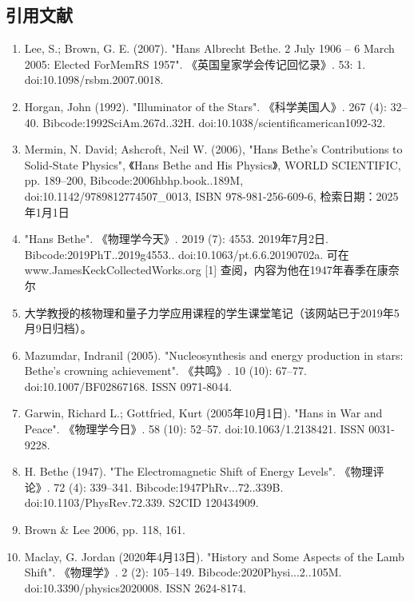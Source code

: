 \subsection{引用文献}  
\begin{enumerate}
\item Lee, S.; Brown, G. E. (2007). "Hans Albrecht Bethe. 2 July 1906 -- 6 March 2005: Elected ForMemRS 1957". 《英国皇家学会传记回忆录》. 53: 1. doi:10.1098/rsbm.2007.0018.  
\item Horgan, John (1992). "Illuminator of the Stars". 《科学美国人》. 267 (4): 32–40. Bibcode:1992SciAm.267d..32H. doi:10.1038/scientificamerican1092-32.  
\item Mermin, N. David; Ashcroft, Neil W. (2006), "Hans Bethe's Contributions to Solid-State Physics", 《Hans Bethe and His Physics》, WORLD SCIENTIFIC, pp. 189–200, Bibcode:2006hbhp.book..189M, doi:10.1142/9789812774507_0013, ISBN 978-981-256-609-6, 检索日期：2025年1月1日  
\item "Hans Bethe". 《物理学今天》. 2019 (7): 4553. 2019年7月2日. Bibcode:2019PhT..2019g4553.. doi:10.1063/pt.6.6.20190702a.  
可在 www.JamesKeckCollectedWorks.org [1] 查阅，内容为他在1947年春季在康奈尔\item 大学教授的核物理和量子力学应用课程的学生课堂笔记（该网站已于2019年5月9日归档）。  
\item Mazumdar, Indranil (2005). "Nucleosynthesis and energy production in stars: Bethe's crowning achievement". 《共鸣》. 10 (10): 67–77. doi:10.1007/BF02867168. ISSN 0971-8044.
\item Garwin, Richard L.; Gottfried, Kurt (2005年10月1日). "Hans in War and Peace". 《物理学今日》. 58 (10): 52–57. doi:10.1063/1.2138421. ISSN 0031-9228.  
\item H. Bethe (1947). "The Electromagnetic Shift of Energy Levels". 《物理评论》. 72 (4): 339–341. Bibcode:1947PhRv...72..339B. doi:10.1103/PhysRev.72.339. S2CID 120434909.  
\item Brown & Lee 2006, pp. 118, 161.  
\item Maclay, G. Jordan (2020年4月13日). "History and Some Aspects of the Lamb Shift". 《物理学》. 2 (2): 105–149. Bibcode:2020Physi...2..105M. doi:10.3390/physics2020008. ISSN 2624-8174.
\end{enumerate}